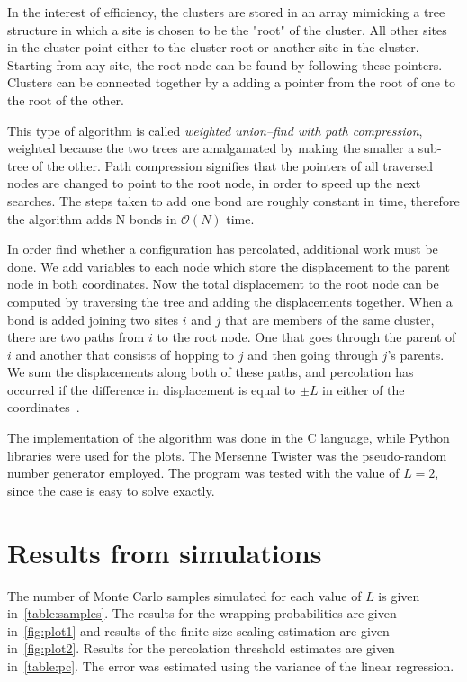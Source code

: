 In the interest of efficiency, the clusters are stored in an array mimicking a tree structure in which a site is chosen to be the "root" of the cluster. All other sites in the cluster point either to the cluster root or another site in the cluster. Starting from any site, the root node can be found by following these pointers. Clusters can be connected together by a adding a pointer from the root of one to the root of the other.

This type of algorithm is called \emph{weighted union–find with path compression}, weighted because the two trees are amalgamated by making the smaller a sub-tree of the other. Path compression signifies that the pointers of all traversed nodes are changed to point to the root node, in order to speed up the next searches. The steps taken to add one bond are roughly constant in time, therefore the algorithm adds N bonds in $\mathcal O(N)$ time.

In order find whether a configuration has percolated, additional work must be done. We add variables to each node which store the displacement to the parent node in both coordinates. Now the total displacement to the root node can be computed by traversing the tree and adding the displacements together. When a bond is added joining two sites $i$ and $j$ that are members of the same cluster, there are two paths from $i$ to the root node. One that goes through the parent of $i$ and another that consists of hopping to $j$ and then going through $j$'s parents. We sum the displacements along both of these paths, and percolation has occurred if the difference in displacement is equal to $\pm L$ in either of the coordinates~\cite{Mertens_2012}. 

The implementation of the algorithm was done in the C language, while Python libraries were used for the plots. The Mersenne Twister was the pseudo-random number generator employed. The program was tested with the value of $L=2$, since the case is easy to solve exactly.

\section{Results from simulations}
The number of Monte Carlo samples simulated for each value of $L$ is given in~\autoref{table:samples}.
The results for the wrapping probabilities are given in~\autoref{fig:plot1} and results of the finite size scaling estimation are given in~\autoref{fig:plot2}. Results for the percolation threshold estimates are given in~\autoref{table:pc}. The error was estimated using the variance of the linear regression.

